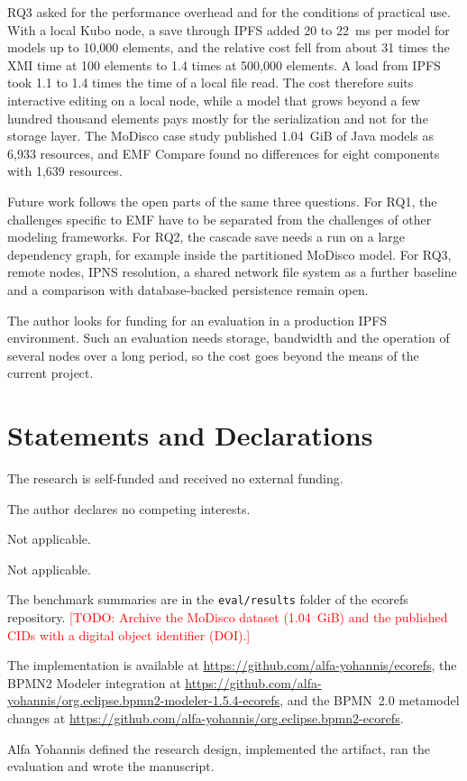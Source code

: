 \documentclass[iicol,pdflatex,sn-mathphys-num]{sn-jnl}
\theoremstyle{thmstylethree}%
\newcommand{\todo}[1]{\textcolor{red}{[TODO: #1]}}
\begin{document}
RQ3 asked for the performance overhead and for the conditions of practical use. With a local Kubo node, a save through IPFS added 20 to 22~ms per model for models up to 10,000 elements, and the relative cost fell from about 31 times the XMI time at 100 elements to 1.4 times at 500,000 elements. A load from IPFS took 1.1 to 1.4 times the time of a local file read. The cost therefore suits interactive editing on a local node, while a model that grows beyond a few hundred thousand elements pays mostly for the serialization and not for the storage layer. The MoDisco case study published 1.04~GiB of Java models as 6,933 resources, and EMF Compare found no differences for eight components with 1,639 resources.

Future work follows the open parts of the same three questions. For RQ1, the challenges specific to EMF have to be separated from the challenges of other modeling frameworks. For RQ2, the cascade save needs a run on a large dependency graph, for example inside the partitioned MoDisco model. For RQ3, remote nodes, IPNS resolution, a shared network file system as a further baseline and a comparison with database-backed persistence remain open.

\backmatter


The author looks for funding for an evaluation in a production IPFS environment. Such an evaluation needs storage, bandwidth and the operation of several nodes over a long period, so the cost goes beyond the means of the current project.

\section*{Statements and Declarations}

The research is self-funded and received no external funding.

The author declares no competing interests.

Not applicable.

Not applicable.

The benchmark summaries are in the \texttt{eval/results} folder of the ecorefs repository. \todo{Archive the MoDisco dataset (1.04~GiB) and the published CIDs with a digital object identifier (DOI).}

The implementation is available at
\url{https://github.com/alfa-yohannis/ecorefs}, the BPMN2 Modeler integration at
\url{https://github.com/alfa-yohannis/org.eclipse.bpmn2-modeler-1.5.4-ecorefs},
and the BPMN~2.0 metamodel changes at
\url{https://github.com/alfa-yohannis/org.eclipse.bpmn2-ecorefs}.

Alfa Yohannis defined the research design, implemented the artifact, ran the evaluation and wrote the manuscript.


\end{document}
